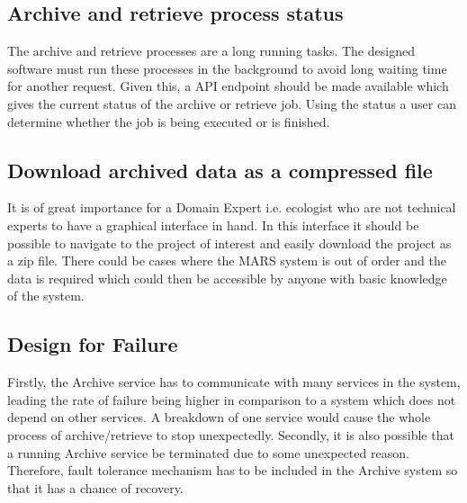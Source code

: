         \subsection{Archive and retrieve process status}  
            The archive and retrieve processes are a long running tasks. The designed software must run these processes in the background to avoid 
            long waiting time for another request. Given this, a API endpoint should be made available which gives the current status of the archive 
            or retrieve job. Using the status a user can determine whether the job is being executed or is finished.


        \subsection{Download archived data as a compressed file}
            It is of great importance for a Domain Expert i.e. ecologist who are not technical experts to have a graphical interface in hand. In this interface
            it should be possible to navigate to the project of interest and easily download the project as a zip file. There could be cases where the
            MARS system is out of order and the data is required which could then be accessible by anyone with basic knowledge of the system.
        
        \subsection{Design for Failure}   
        Firstly, the Archive service has to communicate with many services in the system, leading the rate of failure being higher
        in comparison to a system which does not depend on other services. A breakdown 
        of one service would cause the whole process of archive/retrieve to stop unexpectedly.  Secondly, it is also possible that a running Archive service be terminated
        due to some unexpected reason. Therefore, fault tolerance mechanism has to be included in the Archive system so that it has a chance of 
        recovery. 
